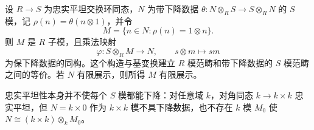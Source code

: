\begin{theorem}[忠实平坦模下降]\label{b3:thm:faithfully-flat-module-descent}
	设 \(R\to S\) 为忠实平坦交换环同态，\(N\) 为带下降数据 \(\theta:N\otimes_RS\to S\otimes_RN\) 的 \(S\) 模，记 \(\rho(n)=\theta(n\otimes1)\)，并令
	\[
		M=\bigl\{n\in N:\rho(n)=1\otimes n\bigr\}.
	\]
	则 \(M\) 是 \(R\) 子模，且乘法映射
	\[
		\varphi:S\otimes_RM\longrightarrow N,\qquad s\otimes m\longmapsto sm
	\]
	为保下降数据的同构。这个构造与基变换建立 \(R\) 模范畴和带下降数据的 \(S\) 模范畴之间的等价。若 \(N\) 有限展示，则所得 \(M\) 有限展示。

	忠实平坦性本身并不使每个 \(S\) 模都能下降：对任意域 \(k\)，对角同态 \(k\to k\times k\) 忠实平坦，但 \(N=k\times0\) 作为 \(k\times k\) 模不具下降数据，也不存在 \(k\) 模 \(M_0\) 使 \(N\cong(k\times k)\otimes_kM_0\)。
\end{theorem}
